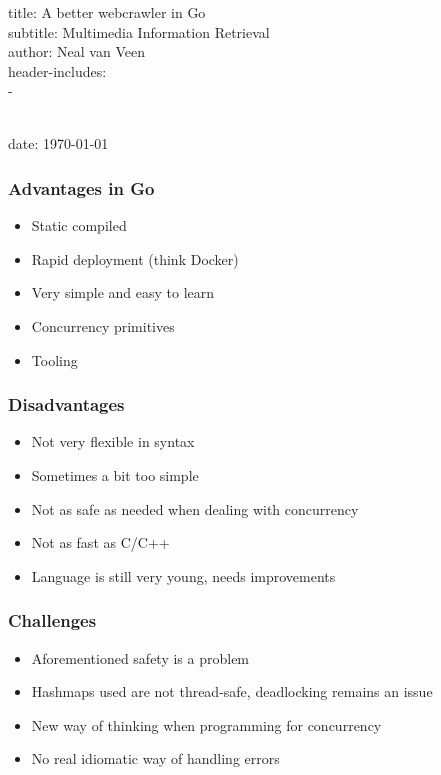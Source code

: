 \documentclass[ignorenonframetext,]{beamer}
\date{}
\begin{document}
\begin{frame}\frametitle{}

{%
}
{%
\FL
title: A better webcrawler in Go
\\\noalign{\medskip}
subtitle: Multimedia Information Retrieval
\\\noalign{\medskip}
author: Neal van Veen
\\\noalign{\medskip}
header-includes:
\\\noalign{\medskip}
- \usepackage{cleveref}
\\\noalign{\medskip}
date: \today
\LL
}

\end{frame}

\begin{frame}\frametitle{Advantages in Go}

\begin{itemize}
\item
  Static compiled
\item
  Rapid deployment (think Docker)
\item
  Very simple and easy to learn
\item
  Concurrency primitives
\item
  Tooling
\end{itemize}
\end{frame}

\begin{frame}\frametitle{Disadvantages}

\begin{itemize}
\item
  Not very flexible in syntax
\item
  Sometimes a bit too simple
\item
  Not as safe as needed when dealing with concurrency
\item
  Not as fast as C/C++
\item
  Language is still very young, needs improvements
\end{itemize}
\end{frame}

\begin{frame}\frametitle{Challenges}

\begin{itemize}
\item
  Aforementioned safety is a problem
\item
  Hashmaps used are not thread-safe, deadlocking remains an issue
\item
  New way of thinking when programming for concurrency
\item
  No real idiomatic way of handling errors
\end{itemize}
\end{frame}
\end{document}
